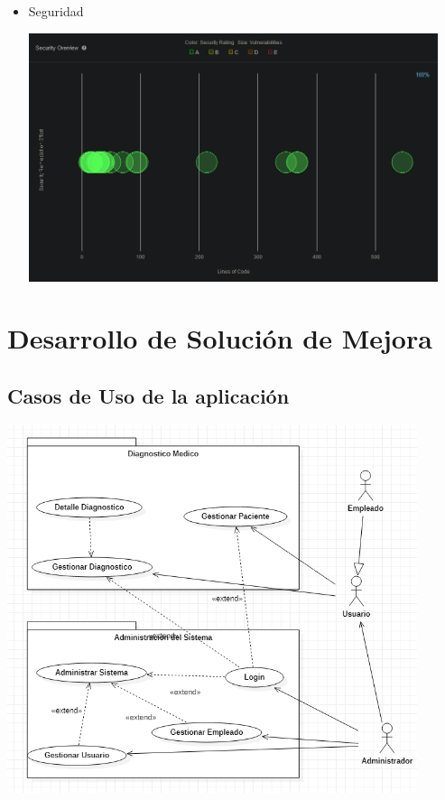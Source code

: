 \documentclass[preprint,12pt]{elsarticle}
\begin{document}
\begin{itemize}
		\item Seguridad
	\begin{center}
	\includegraphics[width=12cm]{./imagen/Screenshot_2020-10-30 Security Overview.png} 
	\end{center}
	
\end{itemize}

\section{Desarrollo de Solución de Mejora}
\subsection{\textbf{ Casos de Uso de la aplicación}}
\begin{center}
	\includegraphics[width=12cm]{./imagen/casouso} 
	\end{center}
\end{document}
